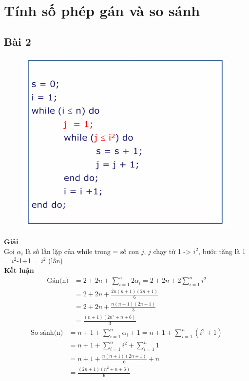 \documentclass[10pt,a4paper]{article}
\begin{document}
\section{Tính số phép gán và so sánh}
\subsection*{Bài 2} %
    \begin{figure}[H]
        \centering\includegraphics[scale=.6]{images/bai2.png} \\
    \end{figure}
     \textbf{Giải} \\
     Gọi $\alpha_i$ là số lần lặp của while trong = số con $j$, $j$ chạy từ 1 -> $i^2$, bước tăng là 1 = $i^2$-1+1 = $i^2$ (lần) \\
     \textbf{Kết luận}\\
     \begin{align*}
          \text{Gán(n)}
            & = 2 + 2n + \sum_{i=1}^{n}{2\alpha_i}
              = 2 + 2n + 2\sum_{i=1}^{n}{i^{2}} \\
            & = 2 + 2n + \frac{2n(n+1)(2n+1)}{6} \\
            & = 2 + 2n + \frac{n(n+1)(2n+1)}{3} \\
            & = \frac{(n+1)(2n^2+n+6)}{3}
    \end{align*}
    \begin{align*}
        \text{So sánh(n)}
            & = n + 1 + \sum_{i=1}^{n}{\alpha_i+1}
              = n + 1 + \sum_{i=1}^{n}{(i^{2}+1)} \\
            & = n + 1 + \sum_{i=1}^{n}{i^{2}} + \sum_{i=1}^{n}{1} \\
            & = n + 1 + \frac{n(n+1)(2n+1)}{6} + n \\
            & = \frac{(2n+1)(n^2+n+6)}{6} 
    \end{align*}
\end{document}
